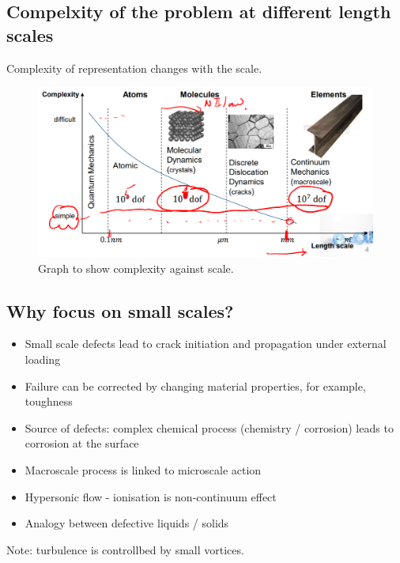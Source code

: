 \documentclass[class=report, crop=false, 12pt,a4paper]{standalone}
\begin{document}
\subsection{Compelxity of the problem at different length scales}
Complexity of representation changes with the scale.
\begin{figure}[H]
	\centering
	\includegraphics[width = \textwidth]{../img/figure2.png}
	\caption{Graph to show complexity against scale.}
\end{figure}
\subsection{Why focus on small scales?}
\begin{itemize}
	\item Small scale defects lead to crack initiation and propagation under external loading
	\item Failure can be corrected by changing material properties, for example, toughness
	\item Source of defects: complex chemical process (chemistry / corrosion) leads to corrosion at the surface
	\item Macroscale process is linked to microscale action
	\item Hypersonic flow - ionisation is non-continuum effect
	\item Analogy between defective liquids / solids
\end{itemize}
Note: turbulence is controllbed by small vortices.
\end{document}
